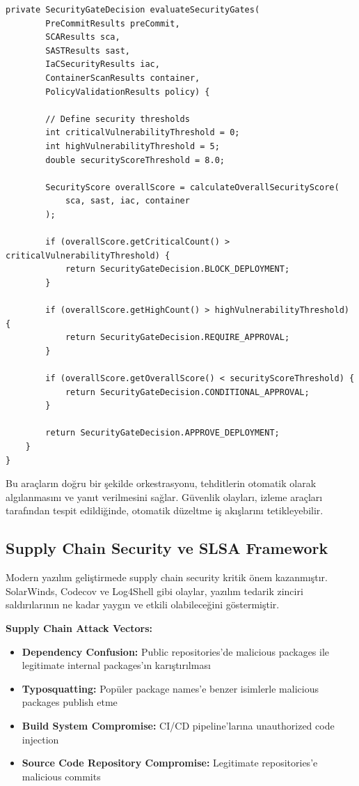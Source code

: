 \begin{lstlisting}[breaklines=true,basicstyle=\ttfamily\footnotesize]
    private SecurityGateDecision evaluateSecurityGates(
        PreCommitResults preCommit,
        SCAResults sca,
        SASTResults sast,
        IaCSecurityResults iac,
        ContainerScanResults container,
        PolicyValidationResults policy) {
        
        // Define security thresholds
        int criticalVulnerabilityThreshold = 0;
        int highVulnerabilityThreshold = 5;
        double securityScoreThreshold = 8.0;
        
        SecurityScore overallScore = calculateOverallSecurityScore(
            sca, sast, iac, container
        );
        
        if (overallScore.getCriticalCount() > criticalVulnerabilityThreshold) {
            return SecurityGateDecision.BLOCK_DEPLOYMENT;
        }
        
        if (overallScore.getHighCount() > highVulnerabilityThreshold) {
            return SecurityGateDecision.REQUIRE_APPROVAL;
        }
        
        if (overallScore.getOverallScore() < securityScoreThreshold) {
            return SecurityGateDecision.CONDITIONAL_APPROVAL;
        }
        
        return SecurityGateDecision.APPROVE_DEPLOYMENT;
    }
}
\end{lstlisting}

Bu araçların doğru bir şekilde orkestrasyonu, tehditlerin otomatik olarak algılanmasını ve yanıt verilmesini sağlar. Güvenlik olayları, izleme araçları tarafından tespit edildiğinde, otomatik düzeltme iş akışlarını tetikleyebilir.

\subsection{Supply Chain Security ve SLSA Framework}

Modern yazılım geliştirmede supply chain security kritik önem kazanmıştır. SolarWinds, Codecov ve Log4Shell gibi olaylar, yazılım tedarik zinciri saldırılarının ne kadar yaygın ve etkili olabileceğini göstermiştir.

\textbf{Supply Chain Attack Vectors:}
\begin{itemize}
    \item \textbf{Dependency Confusion:} Public repositories'de malicious packages ile legitimate internal packages'ın karıştırılması
    \item \textbf{Typosquatting:} Popüler package names'e benzer isimlerle malicious packages publish etme
    \item \textbf{Build System Compromise:} CI/CD pipeline'larına unauthorized code injection
    \item \textbf{Source Code Repository Compromise:} Legitimate repositories'e malicious commits
\end{itemize}

